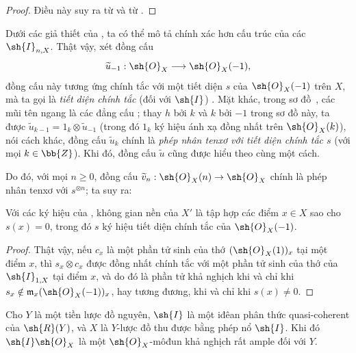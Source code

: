 \documentclass[oneside,10pt]{amsart}
\makeatletter
\renewcommand{\geq}{\geqslant}
\newcommand{\ega@arrow}[2]{\mathchoice{#1}{#2}{#2}{#2}}
\renewcommand{\to}{\ega@arrow{\longrightarrow}{\rightarrow}}
\let\EGAOriginalLabel\label
\renewcommand{\label}[1]{\phantomsection\EGAOriginalLabel{#1}}
\makeatother
\begin{document}
\begin{proof}
Điều này suy ra từ  và từ .
\end{proof}

\begin{env}[8.1.9]
\label{II.8.1.9}
Dưới các giả thiết của , ta có thể mô tả chính xác hơn cấu trúc của các $\sh{I}_{n,X}$.
Thật vậy, xét đồng cấu
\[
  \widetilde{u}_{-1}:\sh{O}_X\to\sh{O}_X(-1),
\]
đồng cấu này tương ứng chính tắc với một tiết diện $s$ của $\sh{O}_X(-1)$ trên $X$, mà ta gọi là \emph{tiết diện chính tắc} (đối với $\sh{I}$) .
Mặt khác, trong sơ đồ~, các mũi tên ngang là các đẳng cấu ; thay $h$ bởi $k$ và $k$ bởi $-1$ trong sơ đồ này, ta được $\widetilde{u}_{k-1}=1_k\otimes\widetilde{u}_{-1}$ (trong đó $1_k$ ký hiệu ánh xạ đồng nhất trên $\sh{O}_X(k)$), nói cách khác, đồng cấu $\widetilde{u}_k$ chính là \emph{phép nhân tenxơ với tiết diện chính tắc $s$} (với mọi $k\in\bb{Z}$).
Khi đó, đồng cấu $\widetilde{u}$  cũng được hiểu theo cùng một cách.

Do đó, với mọi $n\geq0$, đồng cấu $\widetilde{v}_n:\sh{O}_X(n)\to\sh{O}_X$ chính là phép nhân tenxơ với $s^{\otimes n}$; ta suy ra:
\end{env}

\begin{corollary}[8.1.10]
\label{II.8.1.10}
Với các ký hiệu của , không gian nền của $X'$ là tập hợp các điểm $x\in X$ sao cho $s(x)=0$, trong đó $s$ ký hiệu tiết diện chính tắc của $\sh{O}_X(-1)$.
\end{corollary}

\begin{proof}
Thật vậy, nếu $c_x$ là một phần tử sinh của thớ $(\sh{O}_X(1))_x$ tại một điểm $x$, thì $s_x\otimes c_x$ được đồng nhất chính tắc với một phần tử sinh của thớ của $\sh{I}_{1,X}$ tại điểm $x$, và do đó là phần tử khả nghịch khi và chỉ khi $s_x\notin\mathfrak{m}_x(\sh{O}_X(-1))_x$, hay tương đương, khi và chỉ khi $s(x)\neq0$.
\end{proof}

\begin{proposition}[8.1.11]
\label{II.8.1.11}
Cho $Y$ là một tiền lược đồ nguyên, $\sh{I}$ là một iđêan phân thức quasi-coherent của $\sh{R}(Y)$, và $X$ là $Y$-lược đồ thu được bằng phép nổ $\sh{I}$.
Khi đó $\sh{I}\sh{O}_X$ là một $\sh{O}_X$-môđun khả nghịch rất ample đối với $Y$.
\end{proposition}
\end{document}
